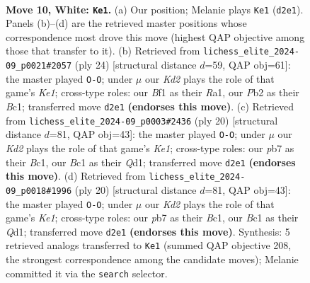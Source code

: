 \documentclass[11pt]{article}
\begin{document}
\clearpage

\begin{figure}[p]\centering
\begin{subfigure}{0.46\textwidth}\centering
\resizebox{\linewidth}{!}{%
\newchessgame
\chessboard[
  setfen={rnbq1kr1/pp2bppp/5n2/3p2N1/3P4/2N5/PP1K1PPP/R1BQ1B1R w - - 2 10},
  showmover=false,
  pgfstyle=straightmove, color=movearrow, markmove={d2-e1}
]}
\caption{}
\end{subfigure}\hfill
\begin{subfigure}{0.46\textwidth}\centering
\resizebox{\linewidth}{!}{%
\newchessgame
\chessboard[
  setfen={r1bq1rk1/ppp3pp/5n2/3pb3/8/2PBN3/PP3PPP/R1BQK2R w KQ - 0 13},
  showmover=false,
  pgfstyle=straightmove, color=movearrow, markmove={e1-g1}
]}
\caption{}
\end{subfigure}
\\[4pt]
\begin{subfigure}{0.46\textwidth}\centering
\resizebox{\linewidth}{!}{%
\newchessgame
\chessboard[
  setfen={r1bqk2r/p3nppp/2p5/2bpP3/8/2NB4/PP3PPP/R1BQK2R w KQkq - 2 11},
  showmover=false,
  pgfstyle=straightmove, color=movearrow, markmove={e1-g1}
]}
\caption{}
\end{subfigure}\hfill
\begin{subfigure}{0.46\textwidth}\centering
\resizebox{\linewidth}{!}{%
\newchessgame
\chessboard[
  setfen={r1bqk2r/p3nppp/2p5/2bpP3/8/2NB4/PP3PPP/R1BQK2R w KQkq - 2 11},
  showmover=false,
  pgfstyle=straightmove, color=movearrow, markmove={e1-g1}
]}
\caption{}
\end{subfigure}
\caption{\textbf{Move 10, White: \texttt{Ke1}.} (a) Our position; Melanie plays \texttt{Ke1} (\texttt{d2e1}). Panels (b)--(d) are the retrieved master positions whose correspondence most drove this move (highest QAP objective among those that transfer to it). (b) Retrieved from \texttt{lichess\_elite\_2024-09\_p0021\#2057} (ply 24) [structural distance $d$=59, QAP obj=61]: the master played \texttt{O-O}; under $\mu$ our \emph{Kd2} plays the role of that game's \emph{Ke1}; cross-type roles: our \emph{B}f1 as their \emph{R}a1, our \emph{P}b2 as their \emph{B}c1; transferred move \texttt{d2e1} \textbf{(endorses this move)}. (c) Retrieved from \texttt{lichess\_elite\_2024-09\_p0003\#2436} (ply 20) [structural distance $d$=81, QAP obj=43]: the master played \texttt{O-O}; under $\mu$ our \emph{Kd2} plays the role of that game's \emph{Ke1}; cross-type roles: our \emph{p}b7 as their \emph{B}c1, our \emph{B}c1 as their \emph{Q}d1; transferred move \texttt{d2e1} \textbf{(endorses this move)}. (d) Retrieved from \texttt{lichess\_elite\_2024-09\_p0018\#1996} (ply 20) [structural distance $d$=81, QAP obj=43]: the master played \texttt{O-O}; under $\mu$ our \emph{Kd2} plays the role of that game's \emph{Ke1}; cross-type roles: our \emph{p}b7 as their \emph{B}c1, our \emph{B}c1 as their \emph{Q}d1; transferred move \texttt{d2e1} \textbf{(endorses this move)}. Synthesis: 5 retrieved analogs transferred to \texttt{Ke1} (summed QAP objective 208, the strongest correspondence among the candidate moves); Melanie committed it via the \texttt{search} selector.}
\label{fig:thought-m18}
\end{figure}
\end{document}
